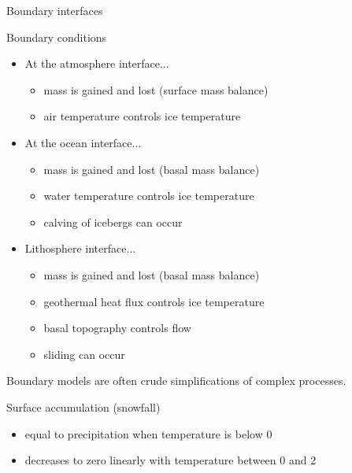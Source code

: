     \begin{frame}[label=model-interfaces]{Boundary interfaces}
      \centering
      \\
      \bigskip
    \end{frame}

    \begin{frame}{Boundary conditions}
      \begin{itemize}
        \item At the atmosphere interface...
          \begin{itemize}
            \item mass is gained and lost (surface mass balance)
            \item air temperature controls ice temperature
          \end{itemize}
        \item At the ocean interface...
          \begin{itemize}
            \item mass is gained and lost (basal mass balance)
            \item water temperature controls ice temperature
            \item calving of icebergs can occur
          \end{itemize}
        \item Lithosphere interface...
          \begin{itemize}
            \item mass is gained and lost (basal mass balance)
            \item geothermal heat flux controls ice temperature
            \item basal topography controls flow
            \item sliding can occur
          \end{itemize}
      \end{itemize}
      \pause
      Boundary models are often crude simplifications of complex processes.
    \end{frame}

    \begin{frame}{Surface accumulation (snowfall)}
      \centering
      \\
      \begin{itemize}
        \item equal to precipitation when temperature is below 0\degC
        \item decreases to zero linearly with temperature between 0 and 2\degC
      \end{itemize}
    \end{frame}

